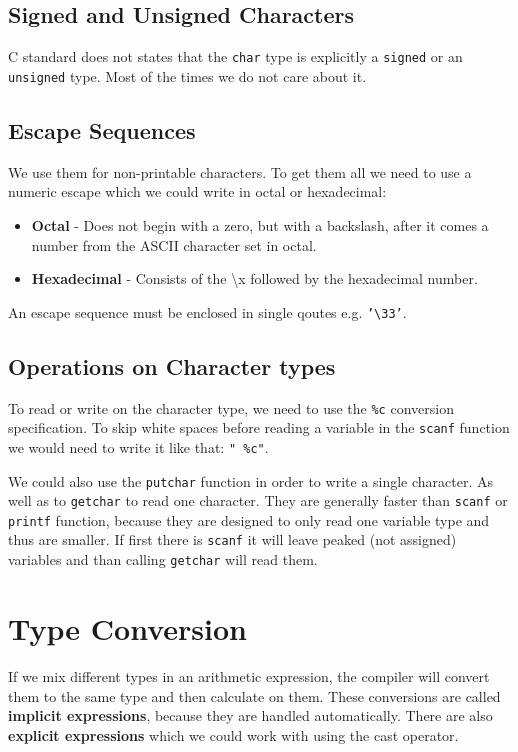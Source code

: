 \documentclass[openany]{book}
\begin{document}
    \subsection*{Signed and Unsigned Characters}
    C standard does not states that the \texttt{char} type is explicitly a \texttt{signed}
    or an \texttt{unsigned} type. Most of the times we do not care about it.

    \subsection*{Escape Sequences}
    We use them for non-printable characters. To get them all we need to use a numeric
    escape which we could write in octal or hexadecimal:
    \begin{itemize}
        \item \textbf{Octal} - Does not begin with a zero, but with a backslash, after it 
        comes a number from the ASCII character set in octal.
        \item \textbf{Hexadecimal} - Consists of the \textbackslash x followed by the hexadecimal
        number.
    \end{itemize}
    An escape sequence must be enclosed in single qoutes e.g. \texttt{'\textbackslash 33'}.

    \subsection*{Operations on Character types}
    To read or write on the character type, we need to use the \texttt{\%c} conversion
    specification. To skip white spaces before reading a variable in the \texttt{scanf}
    function we would need to write it like that: \texttt{" \%c"}.

    \bigskip

    We could also use the \texttt{putchar} function in order to write a single character.
    As well as to \texttt{getchar} to read one character. They are generally faster than
    \texttt{scanf} or \texttt{printf} function, because they are designed to only read
    one variable type and thus are smaller. If first there is \texttt{scanf} it will
    leave peaked (not assigned) variables and than calling \texttt{getchar} will read them.

    \section{Type Conversion}
    If we mix different types in an arithmetic expression, the compiler will convert
    them to the same type and then calculate on them. These conversions are called
    \textbf{implicit expressions}, because they are handled automatically. There are
    also \textbf{explicit expressions} which we could work with using the cast operator.
\end{document}
